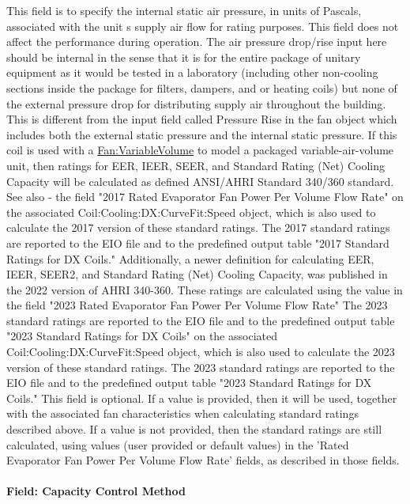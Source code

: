 This field is to specify the internal static air pressure, in units of Pascals, associated with the unit s supply air flow for rating purposes. This field does not affect the performance during operation. The air pressure drop/rise input here should be internal in the sense that it is for the entire package of unitary equipment as it would be tested in a laboratory (including other non-cooling sections inside the package for filters, dampers, and or heating coils) but none of the external pressure drop for distributing supply air throughout the building. This is different from the input field called Pressure Rise in the fan object which includes both the external static pressure and the internal static pressure.
If this coil is used with a \hyperref[fanvariablevolume]{Fan:VariableVolume} to model a packaged variable-air-volume unit, then ratings for  EER, IEER, SEER, and Standard Rating (Net) Cooling Capacity will be calculated as defined ANSI/AHRI Standard 340/360 standard.  See also - the field "2017 Rated Evaporator Fan Power Per Volume Flow Rate" on the associated Coil:Cooling:DX:CurveFit:Speed object, which is also used to calculate the 2017 version of these standard ratings. The 2017 standard ratings are reported to the EIO file and to the predefined output table "2017 Standard Ratings for DX Coils."
Additionally, a newer definition for calculating EER, IEER, SEER2, and Standard Rating (Net) Cooling Capacity, was published in the 2022 version of AHRI 340-360.  These ratings are calculated using the value in the field "2023 Rated Evaporator Fan Power Per Volume Flow Rate"   The 2023 standard ratings are reported to the EIO file and to the predefined output table "2023 Standard Ratings for DX Coils" on the associated Coil:Cooling:DX:CurveFit:Speed object, which is also used to calculate the 2023 version of these standard ratings. The 2023 standard ratings are reported to the EIO file and to the predefined output table "2023 Standard Ratings for DX Coils."
This field is optional. If a value is provided, then it will be used, together with the associated fan characteristics when calculating standard ratings described above. If a value is not provided, then the standard ratings are still calculated, using values (user provided or default values) in the 'Rated Evaporator Fan Power Per Volume Flow Rate' fields, as described in those fields.

\paragraph{Field: Capacity Control Method}

